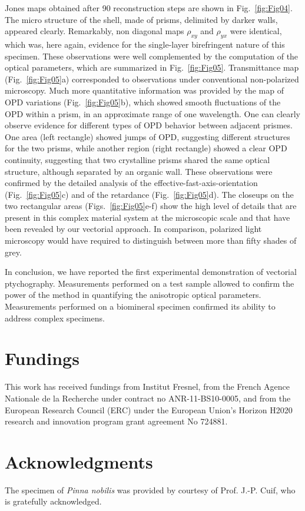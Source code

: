 \documentclass[aps,prl,twocolumn,amsmath]{revtex4-1}
\begin{document}
Jones maps obtained after 90 reconstruction steps are shown in Fig.~\ref{fig:Fig04}. The micro structure of the shell, made of prisms, delimited by darker walls, appeared clearly. Remarkably, non diagonal maps $\rho_{xy}$ and $\rho_{yx}$ were identical, which was, here again, evidence for the single-layer birefringent nature of this specimen. These observations were well complemented by the computation of the optical parameters, which are summarized in Fig.~\ref{fig:Fig05}. Transmittance map (Fig.~\ref{fig:Fig05}a) corresponded to observations under conventional non-polarized microscopy. Much more quantitative information was provided by the map of OPD variations (Fig.~\ref{fig:Fig05}b), which showed smooth fluctuations of the OPD within a prism, in an approximate range of one wavelength. One can clearly observe evidence for different types of OPD behavior between adjacent prismes. One area (left rectangle) showed jumps of OPD, suggesting different structures for the two prisms, while another region (right rectangle) showed a clear OPD continuity, suggesting that two crystalline prisms shared the same optical structure, although separated by an organic wall. These observations were confirmed by the detailed analysis of the effective-fast-axis-orientation (Fig.~\ref{fig:Fig05}c) and of the retardance (Fig.~\ref{fig:Fig05}d). The closeups on the two rectangular areas (Figs.~\ref{fig:Fig05}e-f) show the high level of details that are present in this complex material system at the microscopic scale and that have been revealed by our vectorial approach. In comparison, polarized light microscopy would have required to distinguish between more than fifty shades of grey.

In conclusion, we have reported the first experimental demonstration of vectorial ptychography. Measurements performed on a test sample allowed to confirm the power of the method in quantifying the anisotropic optical parameters. Measurements performed on a biomineral specimen confirmed its ability to address complex specimens.

\section*{Fundings}

This work has received fundings from Institut Fresnel, from the French Agence Nationale de la Recherche under contract no ANR-11-BS10-0005, and from the European Research Council (ERC) under the European Union’s Horizon H2020 research and innovation program grant agreement No 724881.

\section*{Acknowledgments}

The specimen of \emph{Pinna nobilis} was provided by courtesy of Prof. J.-P. Cuif, who is gratefully acknowledged.


\end{document}

